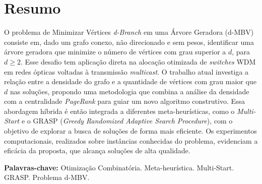 \section*{Resumo}

O problema de Minimizar Vértices \textit{d-Branch} em uma Árvore Geradora (d-MBV) consiste em, dado um grafo conexo, não direcionado e sem pesos, identificar uma árvore geradora que minimize o número de vértices com grau superior a $d$, para $d \ge 2$. Esse desafio tem aplicação direta na alocação otimizada de \textit{switches} WDM em redes ópticas voltadas à transmissão \textit{multicast}. O trabalho atual investiga a relação entre a densidade do grafo e a quantidade de vértices com grau maior que $d$ nas soluções, propondo uma metodologia que combina a análise da densidade com a centralidade \textit{PageRank} para guiar um novo algoritmo construtivo. Essa abordagem híbrida é então integrada a diferentes meta-heurísticas, como o \textit{Multi-Start} e o GRASP (\textit{Greedy Randomized Adaptive Search Procedure}), com o objetivo de explorar a busca de soluções de forma mais eficiente. Os experimentos computacionais, realizados sobre instâncias conhecidas do problema, evidenciam a eficácia da proposta, que alcança soluções de alta qualidade.

\textbf{Palavras-chave:} Otimização Combinatória. Meta-heurística. Multi-Start. GRASP. Problema d-MBV.